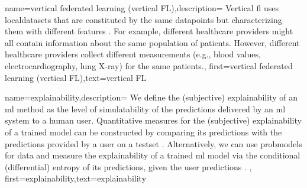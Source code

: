 {name={vertical federated learning (vertical FL)},description=
	{Vertical \gls{fl} uses \gls{localdataset}s that are constituted 
	 by the same \gls{datapoint}s but characterizing them with different \gls{feature}s \cite{VFLChapter}. 
     For example, different healthcare providers might all contain information 
     about the same population of patients. However, different healthcare providers 
     collect different measurements (e.g., blood values, electrocardiography, lung X-ray) 
     for the same patients.},
	first={vertical federated learning (vertical FL)},text={vertical FL}
} 

{name={explainability},description=
		{We define the (subjective) explainability of an \gls{ml} method 
			as the level of simulatability \cite{Colin:2022aa} of the \gls{prediction}s 
			delivered by an \gls{ml} system to a human user. Quantitative measures for the 
			(subjective) explainability of a trained \gls{model} can be constructed by 
			comparing its \gls{prediction}s with the \gls{prediction}s provided by a user 
			on a \gls{testset} \cite{Zhang:2024aa,Colin:2022aa}. Alternatively, we can use 
			\gls{probmodel}s for \gls{data} and measure the explainability of a trained \gls{ml} 
			\gls{model} via the conditional (differential) entropy of its \gls{prediction}s, given the user \gls{prediction}s \cite{JunXML2020,Chen2018}. 
		},
		first={explainability},text={explainability}
	}
	
